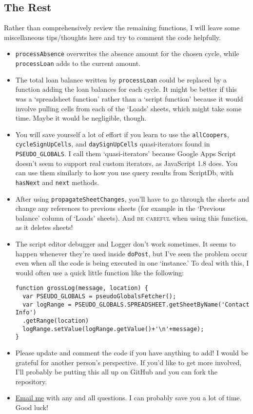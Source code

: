 \documentclass{article}
\begin{document}
\subsection{The Rest}
Rather than comprehensively review the remaining functions, I will leave some miscellaneous tips/thoughts
here and try to comment the code helpfully.
\begin{itemize}
\item
\texttt{processAbsence} overwrites the absence amount for the chosen cycle, while \texttt{processLoan} adds to the current amount.
\item
The total loan balance written by \texttt{processLoan} could be replaced by a function adding the loan balances for each cycle.
It might be better if this was a `spreadsheet function' rather than a `script function' because it would involve pulling cells from each of the `Loads' sheets, which might take some time.
Maybe it would be negligible, though.
\item
You will save yourself a lot of effort if you learn to use the \texttt{allCoopers}, \texttt{cycleSignUpCells}, and \texttt{daySignUpCells} quasi-iterators found in \texttt{PSEUDO\_GLOBALS}.
I call them `quasi-iterators' because Google Apps Script doesn't seem to support real custom iterators, as JavaScript 1.8 does.
You can use them similarly to how you use query results from ScriptDb, with \texttt{hasNext} and \texttt{next} methods.
\item
After using \texttt{propagateSheetChanges}, you'll have to go through the sheets and change any references to previous sheets (for example in the `Previous balance' column of `Loads' sheets).
And {\scshape be careful} when using this function, as it deletes sheets!
\item
The script editor debugger and Logger don't work sometimes.
It seems to happen whenever they're used inside \texttt{doPost}, but I've seen the problem occur even when all the code is being
executed in one `instance.'
To deal with this, I would often use a quick little function like the following:
\begin{verbatim}
function grossLog(message, location) {
  var PSEUDO_GLOBALS = pseudoGlobalsFetcher();
  var logRange = PSEUDO_GLOBALS.SPREADSHEET.getSheetByName('Contact Info')
  .getRange(location)
  logRange.setValue(logRange.getValue()+'\n'+message);
}
\end{verbatim}
\item
Please update and comment the code if you have anything to add! I would be grateful for another person's perspective.
If you'd like to get more involved, I'll probably be putting this all up on GitHub and you can fork the repository.
\item
\href{mailto:ben.e.whitney@post.harvard.edu}{Email me} with any and all questions.
I can probably save you a lot of time.
Good luck!
\end{itemize}
\end{document}
